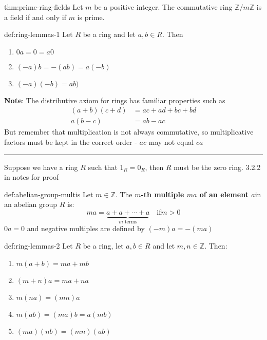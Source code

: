 \documentclass{article}
\begin{document}
\begin{thm}{thm:prime-ring-fields}{}
    Let $m$ be a positive integer. The commutative ring $\mathbb{Z} / m\mathbb{Z}$ is a field if and only if $m$ is prime.
\end{thm}

\begin{thm}{def:ring-lemmas-1}{}
    Let $R$ be a ring and let $a,b\in R$. Then
    \begin{enumerate}
        \item $0a = 0 = a 0$
        \item $(-a)b = -(ab) = a(-b)$
        \item $(-a)(-b) = ab)$
    \end{enumerate}
\end{thm}

\textbf{Note}: The distributive axiom for rings has familiar properties such as
\begin{align*}
    (a + b)(c + d) &= ac + ad + bc + bd\\
    a(b - c) &= ab - ac
\end{align*}
But remember that multiplication is not always commutative, so multiplicative factors must be kept in the correct order - $ac$ may not equal $ca$

\noindent\rule{\textwidth}{0.2pt}
Suppose we have a ring $R$ such that $1_{R} = 0_{R}$, then $R$ must be the zero ring. 3.2.2 in notes for proof

\begin{dfn}{def:abelian-group-multis}{}
    Let $m\in \mathbb{Z}$. The \textbf{$m$-th multiple $ma$ of an element $a$}in an abelian group $R$ is:
    \[ma = \underbrace{a + a + \cdots + a}_{\text{$m$ terms}} \quad \text{if} m > 0\]
    $0a = 0$ and negative multiples are defined by $(-m)a = -(ma)$
\end{dfn}

\newpage
\begin{thm}{def:ring-lemmas-2}{}
    Let $R$ be a ring, let $a,b\in R$ and let $m,n\in \mathbb{Z}$. Then:
    \begin{enumerate}
        \item $m(a + b) = ma + mb$
        \item $(m + n)a = ma + na$
        \item $m(na) = (mn)a$
        \item $m(ab) = (ma)b = a(mb)$
        \item $(ma)(nb) = (mn)(ab)$
    \end{enumerate}
\end{thm}
\end{document}
